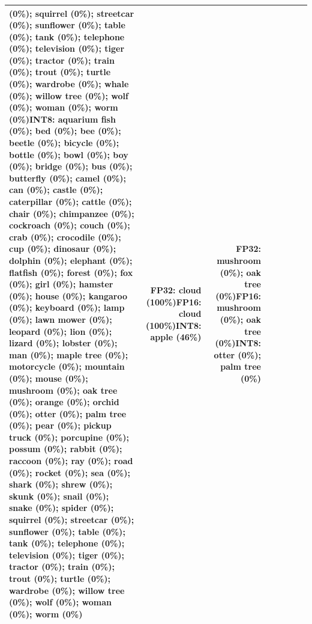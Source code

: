 \begin{longtable}{p{2.8cm} r r r r p{5.0cm} p{4.2cm} p{4.2cm}}
(0\%); squirrel (0\%); streetcar (0\%); sunflower (0\%); table (0\%); tank (0\%); telephone (0\%); television (0\%); tiger (0\%); tractor (0\%); train (0\%); trout (0\%); turtle (0\%); wardrobe (0\%); whale (0\%); willow tree (0\%); wolf (0\%); woman (0\%); worm (0\%)\newline INT8: aquarium fish (0\%); bed (0\%); bee (0\%); beetle (0\%); bicycle (0\%); bottle (0\%); bowl (0\%); boy (0\%); bridge (0\%); bus (0\%); butterfly (0\%); camel (0\%); can (0\%); castle (0\%); caterpillar (0\%); cattle (0\%); chair (0\%); chimpanzee (0\%); cockroach (0\%); couch (0\%); crab (0\%); crocodile (0\%); cup (0\%); dinosaur (0\%); dolphin (0\%); elephant (0\%); flatfish (0\%); forest (0\%); fox (0\%); girl (0\%); hamster (0\%); house (0\%); kangaroo (0\%); keyboard (0\%); lamp (0\%); lawn mower (0\%); leopard (0\%); lion (0\%); lizard (0\%); lobster (0\%); man (0\%); maple tree (0\%); motorcycle (0\%); mountain (0\%); mouse (0\%); mushroom (0\%); oak tree (0\%); orange (0\%); orchid (0\%); otter (0\%); palm tree (0\%); pear (0\%); pickup truck (0\%); porcupine (0\%); possum (0\%); rabbit (0\%); raccoon (0\%); ray (0\%); road (0\%); rocket (0\%); sea (0\%); shark (0\%); shrew (0\%); skunk (0\%); snail (0\%); snake (0\%); spider (0\%); squirrel (0\%); streetcar (0\%); sunflower (0\%); table (0\%); tank (0\%); telephone (0\%); television (0\%); tiger (0\%); tractor (0\%); train (0\%); trout (0\%); turtle (0\%); wardrobe (0\%); willow tree (0\%); wolf (0\%); woman (0\%); worm (0\%) & FP32: cloud (100\%)\newline FP16: cloud (100\%)\newline INT8: apple (46\%) & FP32: mushroom (0\%); oak tree (0\%)\newline FP16: mushroom (0\%); oak tree (0\%)\newline INT8: otter (0\%); palm tree (0\%) \\ \hline

\end{longtable}
